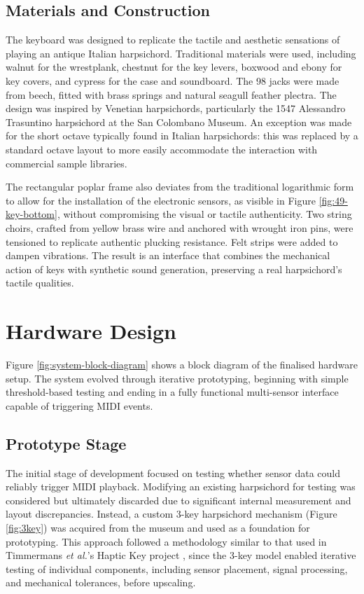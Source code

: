 \subsection{Materials and Construction}

The keyboard was designed to replicate the tactile and aesthetic sensations of playing an antique Italian harpsichord. Traditional materials were used, including walnut for the wrestplank, chestnut for the key levers, boxwood and ebony for key covers, and cypress for the case and soundboard. The 98 jacks were made from beech, fitted with brass springs and natural seagull feather plectra. The design was inspired by Venetian harpsichords, particularly the 1547 Alessandro Trasuntino harpsichord at the San Colombano Museum. An exception was made for the short octave typically found in Italian harpsichords: this was replaced by a standard octave layout to more easily accommodate the interaction with commercial sample libraries. 

The rectangular poplar frame also deviates from the traditional logarithmic form to allow for the installation of the electronic sensors, as visible in Figure \ref{fig:49-key-bottom}, without compromising the visual or tactile authenticity. Two string choirs, crafted from yellow brass wire and anchored with wrought iron pins, were tensioned to replicate authentic plucking resistance. Felt strips were added to dampen vibrations. The result is an interface that combines the mechanical action of keys with synthetic sound generation, preserving a real harpsichord's tactile qualities.


\section{Hardware Design}\label{hardware-design}

Figure \ref{fig:system-block-diagram} shows a block diagram of the finalised hardware setup. The system evolved through iterative prototyping, beginning with simple threshold-based testing and ending in a fully functional multi-sensor interface capable of triggering MIDI events. 

\subsection{Prototype Stage}

The initial stage of development focused on testing whether sensor data could reliably trigger MIDI playback. Modifying an existing harpsichord for testing was considered but ultimately discarded due to significant internal measurement and layout discrepancies. Instead, a custom 3-key harpsichord mechanism (Figure \ref{fig:3key}) was acquired from the museum and used as a foundation for prototyping. This approach followed a methodology similar to that used in Timmermans \emph{et al.}'s Haptic Key project \cite{Timmermans2020}, since the 3-key model enabled iterative testing of individual components, including sensor placement, signal processing, and mechanical tolerances, before upscaling. 

